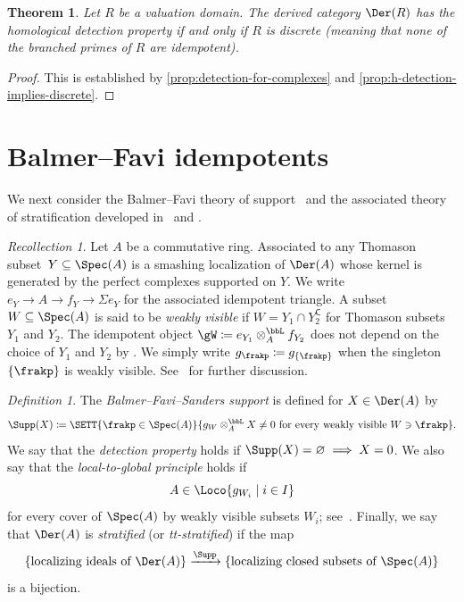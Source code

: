 \documentclass{amsart}
\numberwithin{equation}{section}%
\newtheorem{Thm}[equation]{Theorem}
\theoremstyle{remark}
\newtheorem{Def}[equation]{Definition}
\newtheorem{Rec}[equation]{Recollection}
\renewcommand{\emptyset}{\varnothing}
\renewcommand{\complement}{{\mkern-1mu\mathsf{C}}}
\renewcommand{\complement}{{\mathsf{C}}}
\begin{document}
\begin{Thm}\label{thm:h-detection-char}
	Let $R$ be a valuation domain. The derived category $\Der(R)$ has the homological detection property if and only if $R$ is discrete (meaning that none of the branched primes of $R$ are idempotent).
\end{Thm}

\begin{proof}
	This is established by \cref{prop:detection-for-complexes} and \cref{prop:h-detection-implies-discrete}.
\end{proof}

\section{Balmer--Favi idempotents}

We next consider the Balmer--Favi theory of support~\cite{BalmerFavi11} and the associated theory of stratification developed in~\cite{BarthelHeardSanders23a} and \cite{BillySanders17pp,Zou25}.

\begin{Rec}\label{rec:balmer-favi}
	Let $A$ be a commutative ring. Associated to any Thomason subset~$Y\subseteq\Spec(A)$ is a smashing localization of $\Der(A)$ whose kernel is generated by the perfect complexes supported on $Y$. We write $e_Y \to A \to f_Y \to \Sigma e_Y$ for the associated idempotent triangle. A subset ${W\subseteq\Spec(A)}$ is said to be \emph{weakly visible} if $W=Y_1\cap Y_2^{\complement}$ for Thomason subsets $Y_1$ and $Y_2$. The idempotent object $\gW \coloneqq e_{Y_1} \otimes_A^{\bbL} f_{Y_2}$ does not depend on the choice of $Y_1$ and $Y_2$ by \cite[Remark~7.6]{BalmerFavi11}. We simply write $g_\frakp \coloneqq g_{\{\frakp\}}$ when the singleton $\{\frakp\}$ is weakly visible. See~\cite[Section~4]{BarthelCastellanaHeardSanders23app} for further discussion.
\end{Rec}

\begin{Def}\label{def:tt-support}
    The \emph{Balmer--Favi--Sanders support} is defined for $X \in \Der(A)$ by 
	\[
		\Supp(X) \coloneqq \SETT{\frakp \in \Spec(A)}{g_W \otimes_A^{\bbL} X \neq 0 \text{ for every weakly visible } W \ni \frakp}.
	\]
	We say that the \emph{detection property} holds if $\Supp(X) = \emptyset \implies X = 0$. We also say that the \emph{local-to-global principle} holds if
	\[
		A \in \Loco{g_{W_i} \mid i \in I}
	\]
	for every cover of $\Spec(A)$ by weakly visible subsets $W_i$; see~\cite[Definition~7.1 and Remark~7.2]{Zou25}. Finally, we say that $\Der(A)$ is \emph{stratified} (or \emph{tt-stratified}) if the map 
	\[
		\{\text{localizing ideals of }\Der(A) \} \xrightarrow{\Supp} \{\text{localizing closed subsets of }\Spec(A)\}
	\]
	is a bijection.
\end{Def}
\end{document}
